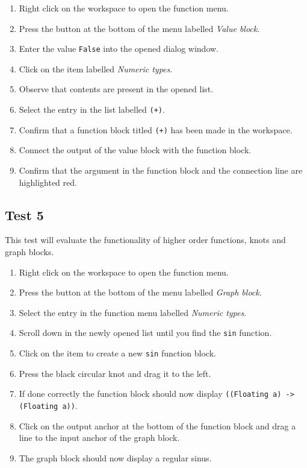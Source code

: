 		\begin{enumerate}
			\item Right click on the workspace to open the function menu.
			\item Press the button at the bottom of the menu labelled \emph{Value block}.
			\item Enter the value \texttt{False} into the opened dialog window.
			\item Click on the item labelled \emph{Numeric types}.
			\item Observe that contents are present in the opened list.
			\item Select the entry in the list labelled \texttt{(+)}.
			\item Confirm that a function block titled \texttt{(+)} has been made in the workspace.
			\item Connect the output of the value block with the function block.
			\item Confirm that the argument in the function block and the connection line are highlighted red.
		\end{enumerate}
	
	\subsection{Test 5}
		This test will evaluate the functionality of higher order functions, knots and graph blocks.
		
		\begin{enumerate}
			\item Right click on the workspace to open the function menu.
			\item Press the button at the bottom of the menu labelled \emph{Graph block}.
			\item Select the entry in the function menu labelled \emph{Numeric types}.
			\item Scroll down in the newly opened list until you find the \texttt{sin} function.
			\item Click on the item to create a new \texttt{sin} function block.
			\item Press the black circular knot and drag it to the left.
			\item If done correctly the function block should now display \texttt{((Floating a) -> (Floating a))}.
			\item Click on the output anchor at the bottom of the function block and drag a line to the input anchor of the graph block.
			\item The graph block should now display a regular sinus.
		\end{enumerate}

